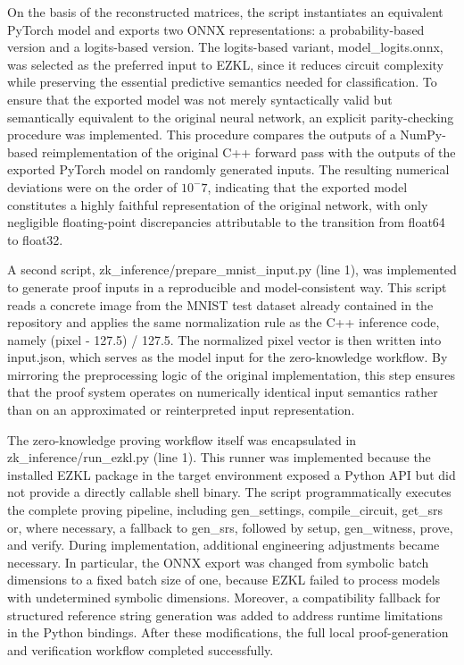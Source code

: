 On the basis of the reconstructed matrices, the script instantiates an equivalent PyTorch model and exports two ONNX representations: a probability-based version and a logits-based version. The logits-based variant, model\_logits.onnx, was selected as the preferred input to EZKL, since it reduces circuit complexity while preserving the essential predictive semantics needed for classification. To ensure that the exported model was not merely syntactically valid but semantically equivalent to the original neural network, an explicit parity-checking procedure was implemented. This procedure compares the outputs of a NumPy-based reimplementation of the original C++ forward pass with the outputs of the exported PyTorch model on randomly generated inputs. The resulting numerical deviations were on the order of $10^-7$, indicating that the exported model constitutes a highly faithful representation of the original network, with only negligible floating-point discrepancies attributable to the transition from float64 to float32.

A second script, zk_inference/prepare_mnist_input.py (line 1), was implemented to generate proof inputs in a reproducible and model-consistent way. This script reads a concrete image from the MNIST test dataset already contained in the repository and applies the same normalization rule as the C++ inference code, namely (pixel - 127.5) / 127.5. The normalized pixel vector is then written into input.json, which serves as the model input for the zero-knowledge workflow. By mirroring the preprocessing logic of the original implementation, this step ensures that the proof system operates on numerically identical input semantics rather than on an approximated or reinterpreted input representation.

The zero-knowledge proving workflow itself was encapsulated in zk_inference/run_ezkl.py (line 1). This runner was implemented because the installed EZKL package in the target environment exposed a Python API but did not provide a directly callable shell binary. The script programmatically executes the complete proving pipeline, including gen_settings, compile_circuit, get_srs or, where necessary, a fallback to gen_srs, followed by setup, gen_witness, prove, and verify. During implementation, additional engineering adjustments became necessary. In particular, the ONNX export was changed from symbolic batch dimensions to a fixed batch size of one, because EZKL failed to process models with undetermined symbolic dimensions. Moreover, a compatibility fallback for structured reference string generation was added to address runtime limitations in the Python bindings. After these modifications, the full local proof-generation and verification workflow completed successfully.

